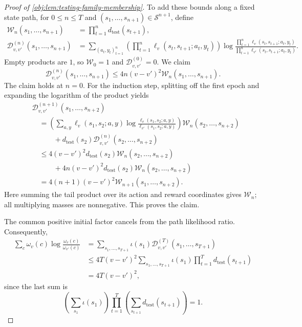 \begin{proof}[Proof of \cref{obj:lem:testing-family-membership}]
To add these bounds along a fixed state path, for \(0\leq n\leq T\) and
\((s_1,\ldots,s_{n+1})\in\mathcal S^{n+1}\), define
\[
\begin{aligned}
\mathcal W_n(s_1,\ldots,s_{n+1})
&=\prod_{t=1}^n d_{\mathrm{test}}(s_{t+1}),\\
\mathcal D_{v,v'}^{(n)}(s_1,\ldots,s_{n+1})
&=\sum_{(a_t,y_t)_{t=1}^n}
 \left(\prod_{t=1}^n\ell_v(s_t,s_{t+1};a_t,y_t)\right)
 \log
 \frac{\prod_{t=1}^n\ell_v(s_t,s_{t+1};a_t,y_t)}
      {\prod_{t=1}^n\ell_{v'}(s_t,s_{t+1};a_t,y_t)}.
\end{aligned}
\]
Empty products are \(1\), so \(\mathcal W_0=1\) and
\(\mathcal D_{v,v'}^{(0)}=0\). We claim
\[
\mathcal D_{v,v'}^{(n)}(s_1,\ldots,s_{n+1})
\leq4n(v-v')^2\mathcal W_n(s_1,\ldots,s_{n+1}).
\]
The claim holds at \(n=0\). For the induction step, splitting off the first epoch and expanding the logarithm of the product yields
\[
\begin{aligned}
&\mathcal D_{v,v'}^{(n+1)}(s_1,\ldots,s_{n+2})\\
&\quad=
\left(
 \sum_{a,y}\ell_v(s_1,s_2;a,y)
 \log\frac{\ell_v(s_1,s_2;a,y)}{\ell_{v'}(s_1,s_2;a,y)}
\right)\mathcal W_n(s_2,\ldots,s_{n+2})\\
&\qquad\quad+
d_{\mathrm{test}}(s_2)
\mathcal D_{v,v'}^{(n)}(s_2,\ldots,s_{n+2})\\
&\quad\leq
4(v-v')^2d_{\mathrm{test}}(s_2)
 \mathcal W_n(s_2,\ldots,s_{n+2})\\
&\qquad\quad+
4n(v-v')^2d_{\mathrm{test}}(s_2)
 \mathcal W_n(s_2,\ldots,s_{n+2})\\
&\quad=
4(n+1)(v-v')^2\mathcal W_{n+1}(s_1,\ldots,s_{n+2}).
\end{aligned}
\]
Here summing the tail product over its action and reward coordinates gives
\(\mathcal W_n\); all multiplying masses are nonnegative. This proves the claim.

The common positive initial factor cancels from the path likelihood ratio. Consequently,
\[
\begin{aligned}
\sum_c\omega_v(c)\log\frac{\omega_v(c)}{\omega_{v'}(c)}
&=
\sum_{s_1,\ldots,s_{T+1}}
\iota(s_1)\mathcal D_{v,v'}^{(T)}(s_1,\ldots,s_{T+1})\\
&\leq
4T(v-v')^2
\sum_{s_1,\ldots,s_{T+1}}
\iota(s_1)\prod_{t=1}^T d_{\mathrm{test}}(s_{t+1})\\
&=4T(v-v')^2,
\end{aligned}
\]
since the last sum is
\[
\left(\sum_{s_1}\iota(s_1)\right)
\prod_{t=1}^T\left(\sum_{s_{t+1}}d_{\mathrm{test}}(s_{t+1})\right)=1.
\]


\end{proof}
